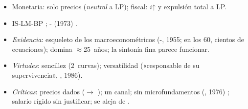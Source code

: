 \documentclass{article}
\begin{document}
\begin{columnas}
\begin{itemize}
\begin{itemize}
  \item Monetaria: solo precios (\emph{neutral} a LP); fiscal: $i$↑ y expulsión total a LP.
  \end{itemize}
\end{itemize}
\begin{itemize}
\item IS-LM-BP ; - (1973) .
\item \emph{Evidencia}: esqueleto de los macroeconométricos (-, 1955; en los 60, cientos de ecuaciones); domina $\approx$25~años; la sintonía fina parece funcionar.
\item \emph{Virtudes}: sencillez (2~curvas); versatilidad («responsable de su supervivencia», , 1986).
\item \emph{Críticas}: precios dados ($\to$ ); un canal; sin microfundamentos (, 1976) ; salario rígido sin justificar; se aleja de  .
\end{itemize}


\end{columnas}
\end{document}
